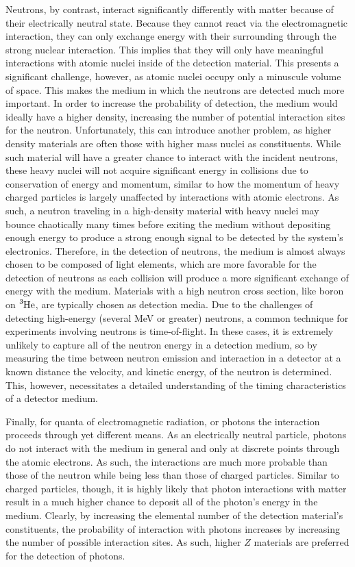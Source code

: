 Neutrons, by contrast, interact significantly differently with matter because of their electrically neutral state. Because they cannot react via the electromagnetic interaction, they can only exchange energy with their surrounding through the strong nuclear interaction. This implies that they will only have meaningful interactions with atomic nuclei inside of the detection material. This presents a significant challenge, however, as atomic nuclei occupy only a minuscule volume of space. This makes the medium in which the neutrons are detected much more important. In order to increase the probability of detection, the medium would ideally have a higher density, increasing the number of potential interaction sites for the neutron. Unfortunately, this can introduce another problem, as higher density materials are often those with higher mass nuclei as constituents. While such material will have a greater chance to interact with the incident neutrons, these heavy nuclei will not acquire significant energy in collisions due to conservation of energy and momentum, similar to how the momentum of heavy charged particles is largely unaffected by interactions with atomic electrons. As such, a neutron traveling in a high-density material with heavy nuclei may bounce chaotically many times before exiting the medium without depositing enough energy to produce a strong enough signal to be detected by the system's electronics. Therefore, in the detection of neutrons, the medium is almost always chosen to be composed of light elements, which are more favorable for the detection of neutrons as each collision will produce a more significant exchange of energy with the medium. Materials with a high neutron cross section, like boron on $\ce{^{3}He}$, are typically chosen as detection media. Due to the challenges of detecting high-energy (several MeV or greater) neutrons, a common technique for experiments involving neutrons is time-of-flight. In these cases, it is extremely unlikely to capture all of the neutron energy in a detection medium, so by measuring the time between neutron emission and interaction in a detector at a known distance the velocity, and kinetic energy, of the neutron is determined. This, however, necessitates a detailed understanding of the timing characteristics of a detector medium.

Finally, for quanta of electromagnetic radiation, or photons the interaction proceeds through yet different means. As an electrically neutral particle, photons do not interact with the medium in general and only at discrete points through the atomic electrons. As such, the interactions are much more probable than those of the neutron while being less than those of charged particles. Similar to charged particles, though, it is highly likely that photon interactions with matter result in a much higher chance to deposit all of the photon's energy in the medium. Clearly, by increasing the elemental number of the detection material's constituents, the probability of interaction with photons increases by increasing the number of possible interaction sites. As such, higher $Z$ materials are preferred for the detection of photons. 

